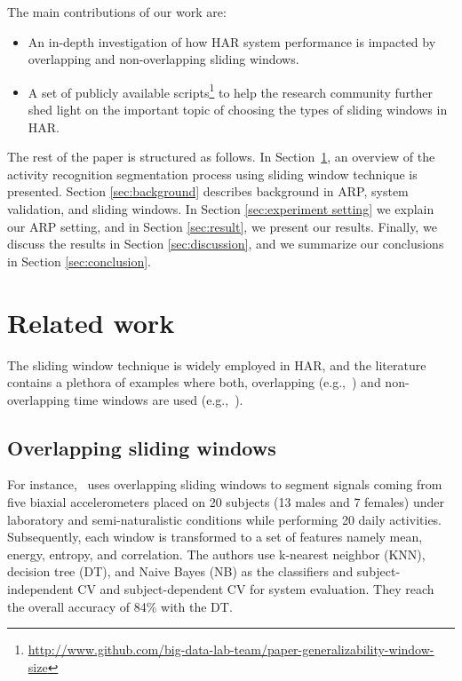 \documentclass[sensors,article,submit,moreauthors,pdftex]{Definitions/mdpi}
\begin{document}
The main contributions of our work are: 

\begin{itemize}

\item An in-depth investigation of how HAR system performance is impacted by overlapping and non-overlapping sliding windows.
\item A set of publicly available scripts\footnote{\url{http://www.github.com/big-data-lab-team/paper-generalizability-window-size}} to help the research community further shed light on the important topic of choosing the types of sliding windows in HAR.
\end{itemize}
The rest of the paper is structured as follows. In Section~\ref{sec:related work}, an overview of the activity recognition segmentation process using sliding window technique is presented. Section \ref{sec:background} describes 
background in ARP, system validation, and sliding windows. In Section 
\ref{sec:experiment setting} we explain our ARP setting, and in Section 
\ref{sec:result}, we present our results. Finally, we discuss the results in Section \ref{sec:discussion}, and 
we summarize our conclusions in Section \ref{sec:conclusion}.


\section{Related work} \label{sec:related work}
The sliding window technique is widely employed in HAR, and the literature contains a plethora of examples where both, overlapping (e.g.,~\cite{bao2004activity,tapia2007real,lara2012centinela,morris2014recofit}) and non-overlapping time windows are used (e.g.,~\cite{minnen2007recognizing,reddy2010using,cheng2010active,banos2014window}).
\subsection{Overlapping sliding windows}
For instance,~\cite{bao2004activity} uses overlapping sliding windows to segment signals coming from five biaxial accelerometers placed on 20 subjects (13 males and 7 females) under laboratory and semi-naturalistic conditions while performing 20 daily activities. Subsequently, each window is transformed to a set of features namely mean, energy, entropy, and correlation. The authors use k-nearest neighbor (KNN), decision tree (DT), and Naive Bayes (NB) as the classifiers and subject-independent CV and subject-dependent CV for system evaluation. They reach the overall accuracy of 84\% with the DT.
\end{document}
